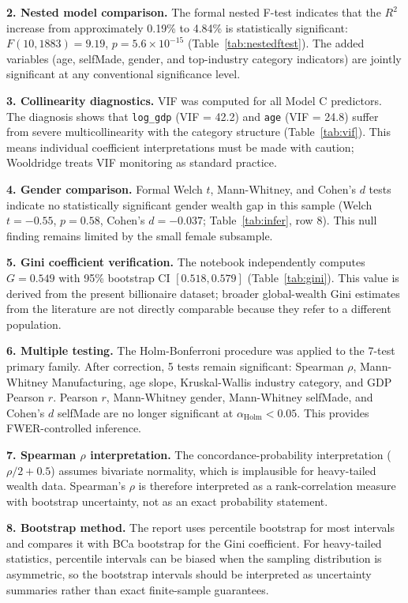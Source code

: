 \documentclass[a4paper,10pt]{article}
\begin{document}
\medskip
\noindent\textbf{2. Nested model comparison.} The formal nested F-test indicates that the $R^2$ increase from approximately 0.19\% to 4.84\% is statistically significant: $F(10, 1883) = 9.19$, $p = 5.6\times10^{-15}$ (Table~\ref{tab:nestedftest}). The added variables (age, selfMade, gender, and top-industry category indicators) are jointly significant at any conventional significance level.

\medskip
\noindent\textbf{3. Collinearity diagnostics.} VIF was computed for all Model C predictors. The diagnosis shows that \texttt{log\_gdp} (VIF = 42.2) and \texttt{age} (VIF = 24.8) suffer from severe multicollinearity with the category structure (Table~\ref{tab:vif}). This means individual coefficient interpretations must be made with caution; Wooldridge \cite{wooldridge2010} treats VIF monitoring as standard practice.

\medskip
\noindent\textbf{4. Gender comparison.} Formal Welch $t$, Mann-Whitney, and Cohen's $d$ tests indicate no statistically significant gender wealth gap in this sample (Welch $t=-0.55$, $p=0.58$, Cohen's $d=-0.037$; Table~\ref{tab:infer}, row 8). This null finding remains limited by the small female subsample.

\medskip
\noindent\textbf{5. Gini coefficient verification.} The notebook independently computes $G=0.549$ with 95\% bootstrap CI $[0.518, 0.579]$ (Table~\ref{tab:gini}). This value is derived from the present billionaire dataset; broader global-wealth Gini estimates from the literature are not directly comparable because they refer to a different population.

\medskip
\noindent\textbf{6. Multiple testing.} The Holm-Bonferroni procedure was applied to the 7-test primary family. After correction, 5 tests remain significant: Spearman $\rho$, Mann-Whitney Manufacturing, age slope, Kruskal-Wallis industry category, and GDP Pearson $r$. Pearson $r$, Mann-Whitney gender, Mann-Whitney selfMade, and Cohen's $d$ selfMade are no longer significant at $\alpha_{\text{Holm}} < 0.05$. This provides FWER-controlled inference.

\medskip
\noindent\textbf{7. Spearman $\rho$ interpretation.} The concordance-probability interpretation ($\rho/2 + 0.5$) assumes bivariate normality, which is implausible for heavy-tailed wealth data. Spearman's $\rho$ is therefore interpreted as a rank-correlation measure with bootstrap uncertainty, not as an exact probability statement.

\medskip
\noindent\textbf{8. Bootstrap method.} The report uses percentile bootstrap for most intervals and compares it with BCa bootstrap for the Gini coefficient. For heavy-tailed statistics, percentile intervals can be biased when the sampling distribution is asymmetric, so the bootstrap intervals should be interpreted as uncertainty summaries rather than exact finite-sample guarantees.
\end{document}
